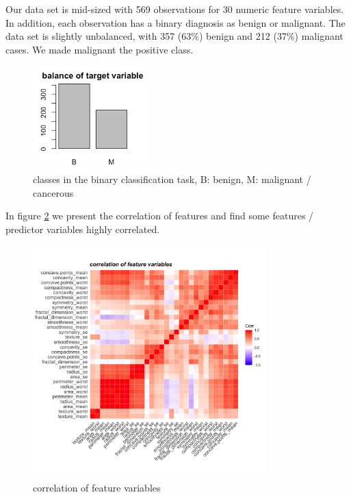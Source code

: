 \documentclass[]{article}
\begin{document}
Our data set is mid-sized with 569 observations for 30 numeric feature
variables. In addition, each observation has a binary diagnosis as
benign or malignant. The data set is slightly unbalanced, with 357
(63\%) benign and 212 (37\%) malignant cases. We made malignant the
positive class.

\begin{figure}
    \centering
    \includegraphics[width=0.4\textwidth]{images/binary-classification.png}
    \caption{classes in the binary classification task, B: benign, M: malignant / cancerous}
    \label{fig:bin_class}
\end{figure}

In figure \ref{fig:cor-1} we present the correlation of features and
find some features / predictor variables highly correlated.

\begin{figure}
    \centering
    \includegraphics[width=0.8\textwidth]{images/correlation-features.png}
    \caption{correlation of feature variables}
    \label{fig:cor-1}
\end{figure}
\end{document}
